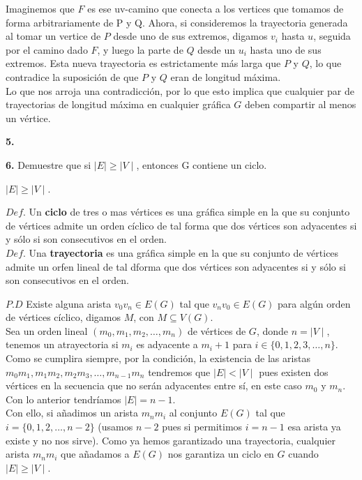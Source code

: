 \documentclass[12pt]{article}
\begin{document}
Imaginemos que $F$ es ese uv-camino que conecta a los vertices que tomamos de forma arbitrariamente 
de P y Q. Ahora, si consideremos la trayectoria generada al tomar un vertice de $P$ desde uno de sus extremos, digamos $v_i$ hasta $u$, seguida por el camino dado
$F$, y luego la parte de $Q$ desde un $u_i$ hasta uno de sus extremos. Esta nueva trayectoria es estrictamente 
más larga que $P$ y $Q$, lo que contradice la suposición de que $P$ y $Q$ eran de longitud máxima.\\

Lo que nos arroja una contradicción, por lo que esto implica que cualquier par de trayectorias de longitud máxima en cualquier gráfica $G$ deben compartir al menos un vértice.

%
%
\textbf{5.} 

%
%
\textbf{6.} Demuestre que si $\mid E \mid \geq\mid V \mid$, entonces G contiene un ciclo.

\begin{tcolorbox}[title=\textbf{Hipotesis}, colback=red!15!white, colframe=black!, breakable]
    $\mid E \mid \geq \mid V \mid$.
\end{tcolorbox}

\begin{tcolorbox}[title=\textbf{Definiciones}, colback=blue!15!white, colframe=black!]
    $Def$. Un \textbf{ciclo} de tres o mas vértices es una gráfica simple en la que su conjunto de
    vértices admite un orden cíclico de tal forma que dos vértices son adyacentes si y sólo si son consecutivos en el orden.\\

    $Def$. Una \textbf{trayectoria} es una gráfica simple en la que su conjunto de vértices admite un orfen lineal de tal dforma 
    que dos vértices son adyacentes si y sólo si son consecutivos en el orden.
\end{tcolorbox}

$P.D$ Existe alguna arista $v_0 v_n \in E(G)$ tal que $v_n v_0 \in E(G)$ para algún orden de vértices cíclico, digamos $M$, con $M \subseteq V(G)$.\\

Sea un orden lineal $(m_0, m_1, m_2, \dots , m_n)$ de vértices de $G$, donde $n = \mid V \mid$, tenemos un atrayectoria si $m_i$ es adyacente a $m_i+1$
para $i \in \{0, 1, 2, 3, \dots, n\}$.\\

Como se cumplira siempre, por la condición, la existencia de las aristas $m_0 m_1, m_1 m_2, m_2 m_3, \dots , m_{n-1} m_n$ tendremos que 
$\mid E \mid < \mid V \mid$ pues existen dos vértices en la secuencia que no serán adyacentes entre sí, en este caso $m_0$ y $m_n$. Con lo anterior 
tendríamos $\mid E \mid = n - 1$.\\

Con ello, si añadimos un arista $m_n m_i$ al conjunto $E(G)$ tal que $i = \{0, 1, 2, \dots, n-2\}$ (usamos $n-2$ pues si permitimos $i = n-1$ esa arista ya existe y no nos sirve).
Como ya hemos garantizado una trayectoria, cualquier arista $m_n m_i$ que añadamos a $E(G)$ nos garantiza un ciclo en $G$ cuando $\mid E \mid \geq \mid V \mid$.
\end{document}
